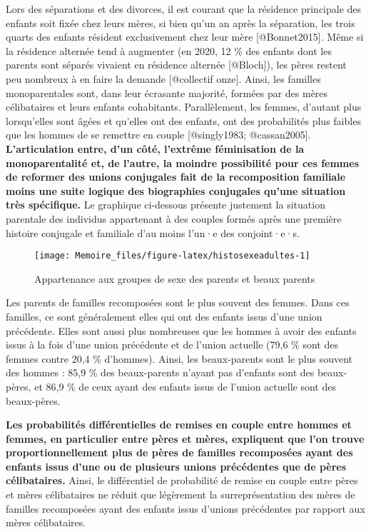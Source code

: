 \documentclass[
  12pt,
]{book}
\begin{document}
Lors des séparations et des divorces, il est courant que la résidence
principale des enfants soit fixée chez leurs mères, si bien qu'un an
après la séparation, les trois quarts des enfants résident exclusivement
chez leur mère {[}@Bonnet2015{]}. Même si la résidence alternée tend à
augmenter (en 2020, 12 \% des enfants dont les parents sont séparés
vivaient en résidence alternée {[}@Bloch{]}), les pères restent peu
nombreux à en faire la demande {[}@collectif onze{]}. Ainsi, les
familles monoparentales sont, dans leur écrasante majorité, formées par
des mères célibataires et leurs enfants cohabitants. Parallèlement, les
femmes, d'autant plus lorsqu'elles sont âgées et qu'elles ont des
enfants, ont des probabilités plus faibles que les hommes de se remettre
en couple {[}@singly1983; @cassan2005{]}. \textbf{L'articulation entre,
d'un côté, l'extrême féminisation de la monoparentalité et, de l'autre,
la moindre possibilité pour ces femmes de reformer des unions conjugales
fait de la recomposition familiale moins une suite logique des
biographies conjugales qu'une situation très spécifique.} Le graphique
ci-dessous présente justement la situation parentale des individus
appartenant à des couples formés après une première histoire conjugale
et familiale d'au moins l'un·e des conjoint·e·s.

\begin{figure}[h]

{\centering \texttt{[image: Memoire\_files/figure-latex/histosexeadultes-1]} 

}

\caption{Appartenance aux groupes de sexe des parents et beaux parents}\label{fig:histosexeadultes}
\end{figure}

Les parents de familles recomposées sont le plus souvent des femmes.
Dans ces familles, ce sont généralement elles qui ont des enfants issus
d'une union précédente. Elles sont aussi plus nombreuses que les hommes
à avoir des enfants issus à la fois d'une union précédente et de l'union
actuelle (79,6 \% sont des femmes contre 20,4 \% d'hommes). Ainsi, les
beaux-parents sont le plus souvent des hommes : 85,9 \% des
beaux-parents n'ayant pas d'enfants sont des beaux-pères, et 86,9 \% de
ceux ayant des enfants issus de l'union actuelle sont des beaux-pères.

\textbf{Les probabilités différentielles de remises en couple entre
hommes et femmes, en particulier entre pères et mères, expliquent que
l'on trouve proportionnellement plus de pères de familles recomposées
ayant des enfants issus d'une ou de plusieurs unions précédentes que de
pères célibataires.} Ainsi, le différentiel de probabilité de remise en
couple entre pères et mères célibataires ne réduit que légèrement la
surreprésentation des mères de familles recomposées ayant des enfants
issus d'unions précédentes par rapport aux mères célibataires.
\end{document}

